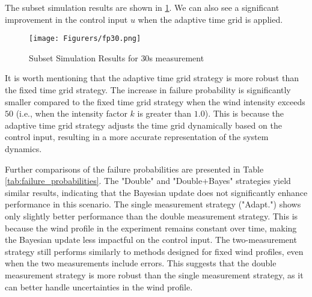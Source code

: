 The subset simulation results are shown in \ref{fig:fp30}. We can also see a significant improvement in the control input $u$ when the adaptive time grid is applied.

\begin{figure}
    \centering
    \texttt{[image: Figurers/fp30.png]}
    \caption{Subset Simulation Results for $30$s measurement}
    \label{fig:fp30}
\end{figure}


It is worth mentioning that the adaptive time grid strategy is more robust than the fixed time grid strategy. The increase in failure probability is significantly smaller compared to the fixed time grid strategy when the wind intensity exceeds $50$ (i.e., when the intensity factor $k$ is greater than $1.0$). This is because the adaptive time grid strategy adjusts the time grid dynamically based on the control input, resulting in a more accurate representation of the system dynamics.

Further comparisons of the failure probabilities are presented in Table \ref{tab:failure_probabilities}. The "Double" and "Double+Bayes" strategies yield similar results, indicating that the Bayesian update does not significantly enhance performance in this scenario. The single measurement strategy ("Adapt.") shows only slightly better performance than the double measurement strategy. This is because the wind profile in the experiment remains constant over time, making the Bayesian update less impactful on the control input. The two-measurement strategy still performs similarly to methods designed for fixed wind profiles, even when the two measurements include errors. This suggests that the double measurement strategy is more robust than the single measurement strategy, as it can better handle uncertainties in the wind profile.

